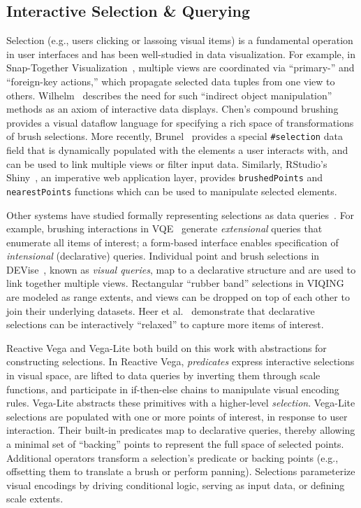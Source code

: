 \vspace{-10pt}

\subsection{Interactive Selection \& Querying}

\vspace{-7pt}

Selection (e.g., users clicking or lassoing visual items) is a fundamental
operation in user interfaces and has been well-studied in data visualization.
For example, in Snap-Together Visualization~\cite{north:snap}, multiple views
are coordinated via ``primary-'' and ``foreign-key actions,'' which propagate
selected data tuples from one view to others. Wilhelm~\cite{wilhelm:interaction}
describes the need for such ``indirect object manipulation'' methods as an axiom
of interactive data displays. Chen's compound brushing~\cite{chen:compound}
provides a visual dataflow language for specifying a rich space of
transformations of brush selections.  More recently, Brunel~\cite{brunel}
provides a special \texttt{\#selection} data field that is dynamically populated
with the elements a user interacts with, and can be used to link multiple views
or filter input data. Similarly, RStudio's Shiny~\cite{shiny}, an imperative web
application layer, provides \texttt{brushedPoints} and \texttt{nearestPoints}
functions which can be used to manipulate selected elements.

Other systems have studied formally representing selections as data
queries~\cite{wilhelm:interaction}. For example, brushing interactions in
VQE~\cite{derthick:interactive} generate \emph{extensional} queries that
enumerate all items of interest; a form-based interface enables specification of
\emph{intensional} (declarative) queries. Individual point and brush selections
in DEVise~\cite{livny:devise}, known as \emph{visual queries}, map to a
declarative structure and are used to link together multiple views. Rectangular
``rubber band'' selections in VIQING~\cite{olsten:viqing} are modeled as range
extents, and views can be dropped on top of each other to join their underlying
datasets. Heer et al.~\cite{heer:generalized} demonstrate that declarative
selections can be interactively ``relaxed'' to capture more items of interest.

Reactive Vega and Vega-Lite both build on this work with abstractions for
constructing selections. In Reactive Vega, \emph{predicates} express interactive
selections in visual space, are lifted to data queries by inverting them through
scale functions, and participate in if-then-else chains to manipulate visual
encoding rules. Vega-Lite abstracts these primitives with a higher-level
\emph{selection}. Vega-Lite selections are populated with one or more points of
interest, in response to user interaction. Their built-in predicates map to
declarative queries, thereby allowing a minimal set of ``backing'' points to
represent the full space of selected points. Additional operators transform a
selection's predicate or backing points (e.g., offsetting them to translate a
brush or perform panning). Selections parameterize visual encodings by driving
conditional logic, serving as input data, or defining scale extents.

